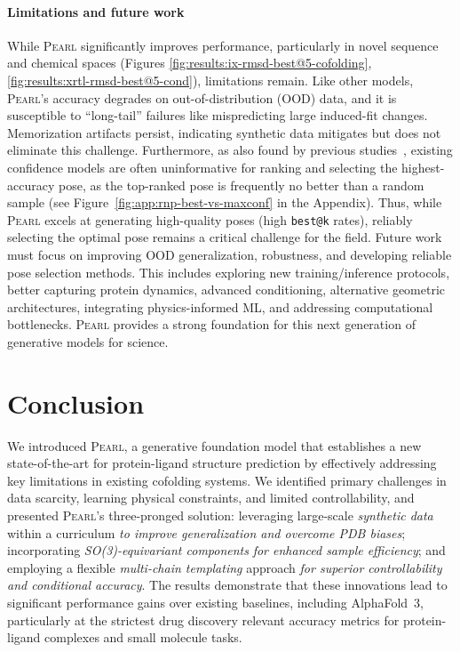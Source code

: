 \documentclass[11pt, letterpaper, onecolumn]{tau-class/tau}
\makeatletter
\newcommand{\pearl}{\textsc{Pearl}\xspace}
\newcommand{\alphafold}[1]{AlphaFold~#1\xspace}
\newcommand{\best}[1]{\texttt{best@#1}\xspace}
\newcommand{\bestk}{\best{k}}
\makeatother
\begin{document}
\paragraph{Limitations and future work}
While \pearl significantly improves performance, particularly in novel sequence and chemical spaces (Figures \ref{fig:results:ix-rmsd-best@5-cofolding}, \ref{fig:results:xrtl-rmsd-best@5-cond}), limitations remain.
Like other models, \pearl's accuracy degrades on out-of-distribution (OOD) data, and it is susceptible to ``long-tail'' failures like mispredicting large induced-fit changes.
Memorization artifacts persist, indicating synthetic data mitigates but does not eliminate this challenge.
Furthermore, as also found by previous studies~\cite{vskrinjar2025have}, existing confidence models are often uninformative for ranking and selecting the highest-accuracy pose, as the top-ranked pose is frequently no better than a random sample (see Figure~\ref{fig:app:rnp-best-vs-maxconf} in the Appendix).
Thus, while \pearl excels at generating high-quality poses (high \bestk rates), reliably selecting the optimal pose remains a critical challenge for the field.
Future work must focus on improving OOD generalization, robustness, and developing reliable pose selection methods.
This includes exploring new training/inference protocols, better capturing protein dynamics, advanced conditioning, alternative geometric architectures, integrating physics-informed ML, and addressing computational bottlenecks.
\pearl provides a strong foundation for this next generation of generative models for science.


\section{Conclusion}
\label{sec:conclusion}

We introduced \pearl, a generative foundation model that establishes a new state-of-the-art for protein-ligand structure prediction by effectively addressing key limitations in existing cofolding systems.
We identified primary challenges in data scarcity, learning physical constraints, and limited controllability, and presented \pearl's three-pronged solution: leveraging large-scale \emph{synthetic data} within a curriculum \emph{to improve generalization and overcome PDB biases}; incorporating \emph{SO(3)-equivariant components} \emph{for enhanced sample efficiency}; and employing a flexible \emph{multi-chain templating} approach \emph{for superior controllability and conditional accuracy}.
The results demonstrate that these innovations lead to significant performance gains over existing baselines, including \alphafold3, particularly at the strictest drug discovery relevant accuracy metrics for protein-ligand complexes and small molecule tasks.
\end{document}
